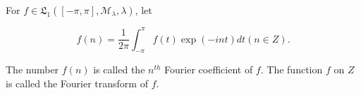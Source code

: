 For $f \in \mathfrak{L}_1([-\pi, \pi], \mathcal{M}_\lambda, \lambda)$, let

$$f(n) = \frac{1}{2\pi} \int_{-\pi}^{\pi} f(t) \exp(-int) dt (n \in Z).$$

The number $f(n)$ is called the $n^{th}$ Fourier coefficient of $f$. The function $f$ on $Z$ is called the Fourier transform of $f$.